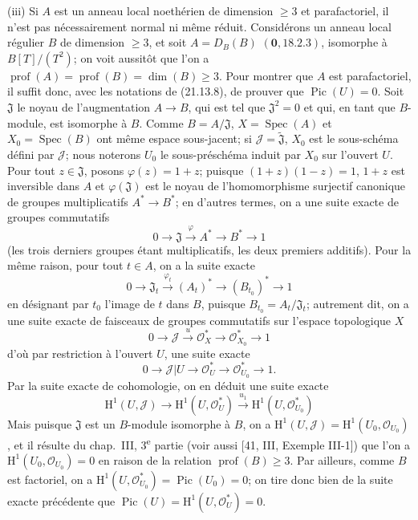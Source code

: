 \begin{env}[21.13.9]
(iii) Si $A$ est un anneau local noethérien de dimension $\geq3$ et parafactoriel, il
n'est pas nécessairement normal ni même réduit. Considérons un anneau local régulier
$B$ de dimension $\geq3$, et soit $A=D_B(B)$ $(\mathbf 0, 18.2.3)$, isomorphe à
$B[T]/(T^2)$; on voit aussitôt que l'on a
$\operatorname{prof}(A)=\operatorname{prof}(B)=\dim(B)\geq3$. Pour montrer que $A$
est parafactoriel, il suffit donc, avec les notations de (21.13.8), de prouver que
$\operatorname{Pic}(U)=0$. Soit $\mathfrak J$ le noyau de l'augmentation $A\to B$,
qui est tel que $\mathfrak J^2=0$ et qui, en tant que $B$-module, est isomorphe à $B$.
Comme $B=A/\mathfrak J$, $X=\operatorname{Spec}(A)$ et
$X_0=\operatorname{Spec}(B)$ ont même espace sous-jacent; si
$\mathscr J=\widetilde{\mathfrak J}$, $X_0$ est le sous-schéma défini par
$\mathscr J$; nous noterons $U_0$ le sous-préschéma induit par $X_0$ sur l'ouvert
$U$. Pour tout $z\in\mathfrak J$, posons $\varphi(z)=1+z$; puisque
$(1+z)(1-z)=1$, $1+z$ est inversible dans $A$ et $\varphi(\mathfrak J)$ est le noyau
de l'homomorphisme surjectif canonique de groupes multiplicatifs $A^*\to B^*$; en
d'autres termes, on a une suite exacte de groupes commutatifs
\[
  0\longrightarrow\mathfrak J\xrightarrow{\varphi}A^*\longrightarrow B^*
  \longrightarrow1
\]
(les trois derniers groupes étant multiplicatifs, les deux premiers additifs). Pour la
même raison, pour tout $t\in A$, on a la suite exacte
\[
  0\longrightarrow\mathfrak J_t\xrightarrow{\varphi_t}(A_t)^*
  \longrightarrow(B_{t_0})^*\longrightarrow1
\]
en désignant par $t_0$ l'image de $t$ dans $B$, puisque
$B_{t_0}=A_t/\mathfrak J_t$; autrement dit, on a une suite exacte de faisceaux de
groupes commutatifs sur l'espace topologique $X$
\[
  0\longrightarrow\mathscr J\xrightarrow{u}\mathcal O_X^*
  \longrightarrow\mathcal O_{X_0}^*\longrightarrow1
\]
d'où par restriction à l'ouvert $U$, une suite exacte
\[
  0\longrightarrow\mathscr J|U\longrightarrow\mathcal O_U^*
  \longrightarrow\mathcal O_{U_0}^*\longrightarrow1.
\]
Par la suite exacte de cohomologie, on en déduit une suite exacte
\[
\label{IV.21.13.9.1}
  \mathrm H^1(U,\mathscr J)\longrightarrow\mathrm H^1(U,\mathcal O_U^*)
  \xrightarrow{u_1}\mathrm H^1(U,\mathcal O_{U_0}^*)
  \tag{21.13.9.1}
\]
Mais puisque $\mathfrak J$ est un $B$-module isomorphe à $B$, on a
$\mathrm H^1(U,\mathscr J)=\mathrm H^1(U_0,\mathcal O_{U_0})$, et il résulte du
chap.~III, 3\textsuperscript{e} partie (voir aussi [41, III, Exemple III-1]) que l'on a
$\mathrm H^1(U_0,\mathcal O_{U_0})=0$ en raison de la relation
$\operatorname{prof}(B)\geq3$. Par ailleurs, comme $B$ est factoriel, on a
$\mathrm H^1(U,\mathcal O_{U_0}^*)=\operatorname{Pic}(U_0)=0$; on tire donc bien de
la suite exacte précédente que
$\operatorname{Pic}(U)=\mathrm H^1(U,\mathcal O_U^*)=0$.


\end{env}
